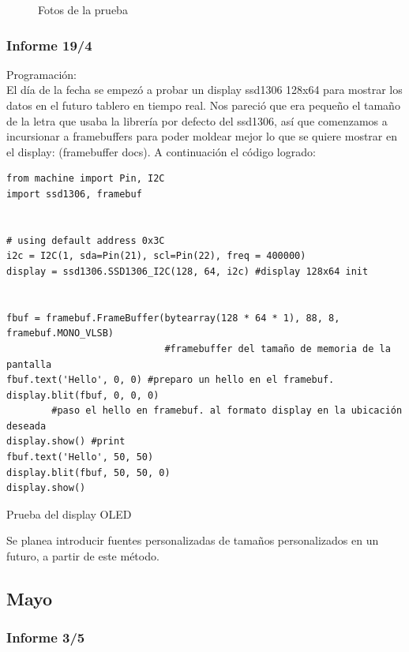 \begin{figure}[H]
\begin{subfigure}{0.5\textwidth}
\caption{}
\end{subfigure}

\caption{Fotos de la prueba}
\end{figure}

\subsubsection{Informe 19/4}

Programación:\\

El día de la fecha se empezó a probar un display ssd1306 128x64 para mostrar los datos en el futuro tablero en tiempo real. Nos pareció que era pequeño el tamaño de la letra que usaba la librería por defecto del ssd1306, así que comenzamos a incursionar a framebuffers para poder moldear mejor lo que se quiere mostrar en el display: (framebuffer docs). A continuación el código logrado:\\

\begin{listing}[H]
\begin{verbatim}
from machine import Pin, I2C
import ssd1306, framebuf


# using default address 0x3C
i2c = I2C(1, sda=Pin(21), scl=Pin(22), freq = 400000)
display = ssd1306.SSD1306_I2C(128, 64, i2c) #display 128x64 init


fbuf = framebuf.FrameBuffer(bytearray(128 * 64 * 1), 88, 8, framebuf.MONO_VLSB)
                            #framebuffer del tamaño de memoria de la pantalla
fbuf.text('Hello', 0, 0) #preparo un hello en el framebuf.
display.blit(fbuf, 0, 0, 0) 
        #paso el hello en framebuf. al formato display en la ubicación deseada
display.show() #print
fbuf.text('Hello', 50, 50)
display.blit(fbuf, 50, 50, 0)
display.show()
\end{verbatim}
\caption{Prueba del display OLED}
\label{display oled}
\end{listing}

Se planea introducir fuentes personalizadas de tamaños personalizados en un futuro, a partir de este método.\\

\subsection{Mayo}

\subsubsection{Informe 3/5}


